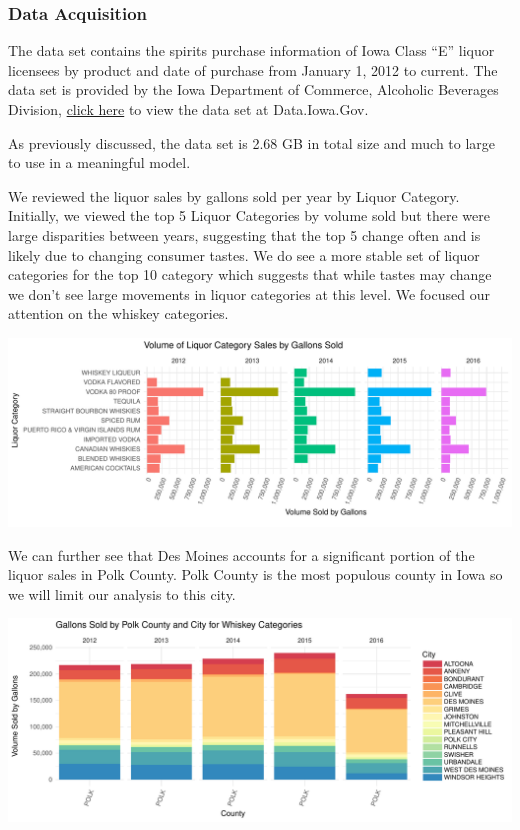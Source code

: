 \documentclass[]{elsarticle} %
\makeatletter
\def\maxwidth{\ifdim\Gin@nat@width>\linewidth\linewidth
\else\Gin@nat@width\fi}
\let\Oldincludegraphics\includegraphics
\renewcommand{\includegraphics}[1]{\Oldincludegraphics[width=\maxwidth]{#1}}
\makeatother
\begin{document}
\subsubsection{Data Acquisition}\label{data-acquisition}

The data set contains the spirits purchase information of Iowa Class
``E'' liquor licensees by product and date of purchase from January 1,
2012 to current. The data set is provided by the Iowa Department of
Commerce, Alcoholic Beverages Division,
\href{https://data.iowa.gov/Economy/Iowa-Liquor-Sales/m3tr-qhgy}{click
here} to view the data set at Data.Iowa.Gov.

As previously discussed, the data set is 2.68 GB in total size and much
to large to use in a meaningful model.

We reviewed the liquor sales by gallons sold per year by Liquor
Category. Initially, we viewed the top 5 Liquor Categories by volume
sold but there were large disparities between years, suggesting that the
top 5 change often and is likely due to changing consumer tastes. We do
see a more stable set of liquor categories for the top 10 category which
suggests that while tastes may change we don't see large movements in
liquor categories at this level. We focused our attention on the whiskey
categories.

\includegraphics{Final_Project_files/figure-latex/unnamed-chunk-6-1.pdf}

We can further see that Des Moines accounts for a significant portion of
the liquor sales in Polk County. Polk County is the most populous county
in Iowa so we will limit our analysis to this city.

\includegraphics{Final_Project_files/figure-latex/unnamed-chunk-9-1.pdf}
\end{document}
